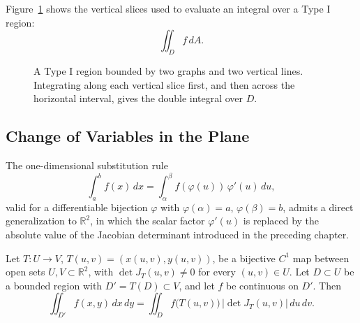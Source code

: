 Figure~\ref{fig:ch11-typeI-region} shows the vertical slices used to evaluate an integral over a Type I region:
\[
\iint_D f\,dA.
\]

\begin{figure}[!htbp]
\centering
{}
\caption[Type I region]{A Type I region bounded by two graphs and two vertical lines. Integrating along each vertical slice first, and then across the horizontal interval, gives the double integral over $D$.}
\label{fig:ch11-typeI-region}
\end{figure}



\subsection{Change of Variables in the Plane}

The one-dimensional substitution rule \[
\int_a^b f(x)\,dx = \int_{\alpha}^{\beta} f(\varphi(u))\,\varphi'(u)\,du,
\] valid for a differentiable bijection $\varphi$ with $\varphi(\alpha)=a$, $\varphi(\beta)=b$, admits a direct generalization to $\mathbb{R}^2$, in which the scalar factor $\varphi'(u)$ is replaced by the absolute value of the Jacobian determinant introduced in the preceding chapter.

\begin{theorem}
Let $T : U \to V$, $T(u,v) = (x(u,v),y(u,v))$, be a bijective $C^1$ map between open sets $U,V \subset \mathbb{R}^2$, with $\det J_T(u,v) \neq 0$ for every $(u,v) \in U$. Let $D \subset U$ be a bounded region with $D' = T(D) \subset V$, and let $f$ be continuous on $D'$. Then
\[
\iint_{D'} f(x,y)\, dx\, dy = \iint_D f\big(T(u,v)\big)\, |\det J_T(u,v)|\, du\, dv.
\]

\end{theorem}

